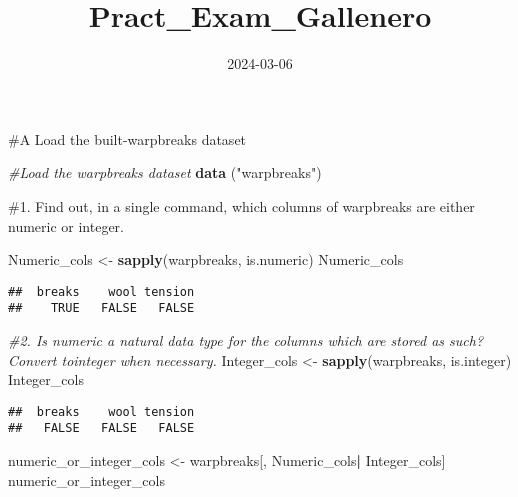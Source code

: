 \documentclass[
]{article}
\title{Pract\_Exam\_Gallenero}
\author{}
\date{\vspace{-2.5em}2024-03-06}
\newenvironment{Shaded}{\begin{snugshade}}{\end{snugshade}}
\newcommand{\CommentTok}[1]{\textcolor[rgb]{0.56,0.35,0.01}{\textit{#1}}}
\newcommand{\FunctionTok}[1]{\textcolor[rgb]{0.13,0.29,0.53}{\textbf{#1}}}
\newcommand{\NormalTok}[1]{#1}
\newcommand{\OtherTok}[1]{\textcolor[rgb]{0.56,0.35,0.01}{#1}}
\newcommand{\SpecialCharTok}[1]{\textcolor[rgb]{0.81,0.36,0.00}{\textbf{#1}}}
\newcommand{\StringTok}[1]{\textcolor[rgb]{0.31,0.60,0.02}{#1}}
\begin{document}
\maketitle

\#A Load the built-warpbreaks dataset

\begin{Shaded}
\begin{Highlighting}[]
\CommentTok{\#Load the warpbreaks dataset}
\FunctionTok{data}\NormalTok{ (}\StringTok{"warpbreaks"}\NormalTok{)}
\end{Highlighting}
\end{Shaded}

\#1. Find out, in a single command, which columns of warpbreaks are
either numeric or integer.

\begin{Shaded}
\begin{Highlighting}[]
\NormalTok{Numeric\_cols }\OtherTok{\textless{}{-}} \FunctionTok{sapply}\NormalTok{(warpbreaks, is.numeric)}
\NormalTok{Numeric\_cols}
\end{Highlighting}
\end{Shaded}

\begin{verbatim}
##  breaks    wool tension 
##    TRUE   FALSE   FALSE
\end{verbatim}

\begin{Shaded}
\begin{Highlighting}[]
\CommentTok{\#2. Is numeric a natural data type for the columns which are stored as such? Convert tointeger when necessary.}
\NormalTok{Integer\_cols }\OtherTok{\textless{}{-}} \FunctionTok{sapply}\NormalTok{(warpbreaks, is.integer)}
\NormalTok{Integer\_cols}
\end{Highlighting}
\end{Shaded}

\begin{verbatim}
##  breaks    wool tension 
##   FALSE   FALSE   FALSE
\end{verbatim}

\begin{Shaded}
\begin{Highlighting}[]
\NormalTok{numeric\_or\_integer\_cols }\OtherTok{\textless{}{-}}\NormalTok{ warpbreaks[, Numeric\_cols}\SpecialCharTok{|}\NormalTok{ Integer\_cols]}
\NormalTok{numeric\_or\_integer\_cols}
\end{Highlighting}
\end{Shaded}
\end{document}
